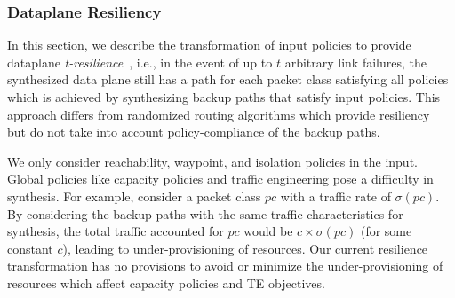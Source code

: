 

\subsubsection{Dataplane Resiliency}
\label{sec:resiliency}


In this section, we describe the transformation of input policies to
provide dataplane \emph{t-resilience}~\cite{plinko}, i.e., in the event of
up to $t$ arbitrary link failures, the synthesized data plane still has
a path for each packet class satisfying all policies which is achieved
by synthesizing backup paths that satisfy input policies. 
This approach differs 
from randomized routing algorithms which provide resiliency~\cite{randrouting}
but do not take into account policy-compliance of the backup paths.

We only consider reachability, 
waypoint, and isolation policies in the input.
Global policies like capacity policies and traffic engineering pose a
difficulty in synthesis. For example, consider a packet class $pc$
with a traffic rate of $\sigma(pc)$. By considering the backup paths
with the same traffic characteristics for synthesis, the total traffic
accounted for $pc$ would be $c\times \sigma(pc)$ (for some constant
$c$), leading to under-provisioning of resources. Our current
resilience transformation has no provisions to avoid or minimize the
under-provisioning of resources which affect capacity policies and TE
objectives.


